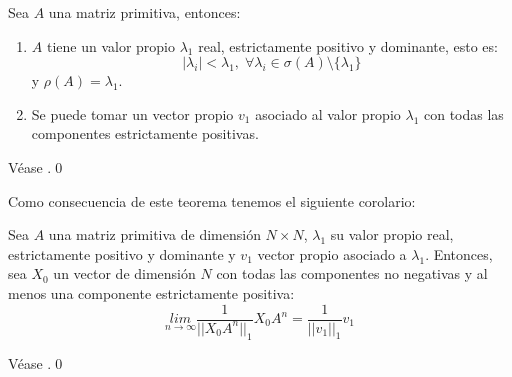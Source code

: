 \begin{theorem} \label{Perron-Frobenius}
    Sea $A$ una matriz primitiva, entonces:
    \begin{enumerate}
        \item $A$ tiene un valor propio $\lambda_1$ real, estrictamente positivo y dominante, esto es:
        \[|\lambda_i|<\lambda_1,\; \forall\lambda_i\in\sigma(A)\setminus \{\lambda_1\}\]
        y $\rho(A)=\lambda_1$.
        \item Se puede tomar un vector propio $v_1$ asociado al valor propio $\lambda_1$ con todas las componentes estrictamente positivas.
    \end{enumerate}
\end{theorem}
\begin{proofs*}
    Véase \cite[Página 202]{Salinelli}.\qed
\end{proofs*}
Como consecuencia de este teorema tenemos el siguiente corolario:
\begin{corollary} \label{colorarioPerron}
    Sea $A$ una matriz primitiva de dimensión $N\times N$, $\lambda_1$ su valor propio real, estrictamente positivo y dominante y $v_1$ vector propio asociado a $\lambda_1$. Entonces, sea $X_0$ un vector de dimensión $N$ con todas las componentes no negativas y al menos una componente estrictamente positiva:
    \[\underset{n\rightarrow\infty}{lim}\frac{1}{||X_0A^n||_1}X_0A^n=\frac{1}{||v_1||_1}v_1\]
\end{corollary}
\begin{proofs*}
    Véase \cite[Página 201, Teorema 5.19]{Salinelli}.\qed
\end{proofs*}